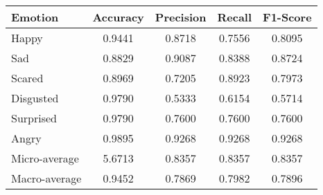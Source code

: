 \begin{tabular}{lcccc}
\toprule
Emotion & Accuracy & Precision & Recall & F1-Score \\
\midrule
Happy & 0.9441 & 0.8718 & 0.7556 & 0.8095 \\
Sad & 0.8829 & 0.9087 & 0.8388 & 0.8724 \\
Scared & 0.8969 & 0.7205 & 0.8923 & 0.7973 \\
Disgusted & 0.9790 & 0.5333 & 0.6154 & 0.5714 \\
Surprised & 0.9790 & 0.7600 & 0.7600 & 0.7600 \\
Angry & 0.9895 & 0.9268 & 0.9268 & 0.9268 \\
Micro-average & 5.6713 & 0.8357 & 0.8357 & 0.8357 \\
Macro-average & 0.9452 & 0.7869 & 0.7982 & 0.7896 \\
\bottomrule
\end{tabular}
